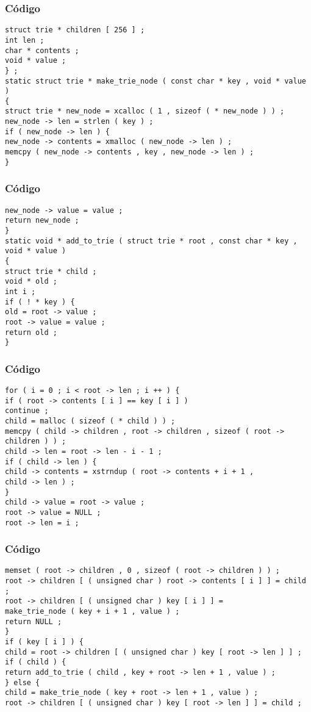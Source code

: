 \documentclass{beamer}
\begin{document}
\begin{frame}[fragile]
\frametitle{C\'odigo}
\begin{verbatim}
struct trie * children [ 256 ] ; 
int len ; 
char * contents ; 
void * value ; 
} ; 
static struct trie * make_trie_node ( const char * key , void * value ) 
{ 
struct trie * new_node = xcalloc ( 1 , sizeof ( * new_node ) ) ; 
new_node -> len = strlen ( key ) ; 
if ( new_node -> len ) { 
new_node -> contents = xmalloc ( new_node -> len ) ; 
memcpy ( new_node -> contents , key , new_node -> len ) ; 
} 
\end{verbatim}
\end{frame}
\begin{frame}[fragile]
\frametitle{C\'odigo}
\begin{verbatim}
new_node -> value = value ; 
return new_node ; 
} 
static void * add_to_trie ( struct trie * root , const char * key , void * value ) 
{ 
struct trie * child ; 
void * old ; 
int i ; 
if ( ! * key ) { 
old = root -> value ; 
root -> value = value ; 
return old ; 
} 
\end{verbatim}
\end{frame}
\begin{frame}[fragile]
\frametitle{C\'odigo}
\begin{verbatim}
for ( i = 0 ; i < root -> len ; i ++ ) { 
if ( root -> contents [ i ] == key [ i ] ) 
continue ; 
child = malloc ( sizeof ( * child ) ) ; 
memcpy ( child -> children , root -> children , sizeof ( root -> children ) ) ; 
child -> len = root -> len - i - 1 ; 
if ( child -> len ) { 
child -> contents = xstrndup ( root -> contents + i + 1 , 
child -> len ) ; 
} 
child -> value = root -> value ; 
root -> value = NULL ; 
root -> len = i ; 
\end{verbatim}
\end{frame}
\begin{frame}[fragile]
\frametitle{C\'odigo}
\begin{verbatim}
memset ( root -> children , 0 , sizeof ( root -> children ) ) ; 
root -> children [ ( unsigned char ) root -> contents [ i ] ] = child ; 
root -> children [ ( unsigned char ) key [ i ] ] = 
make_trie_node ( key + i + 1 , value ) ; 
return NULL ; 
} 
if ( key [ i ] ) { 
child = root -> children [ ( unsigned char ) key [ root -> len ] ] ; 
if ( child ) { 
return add_to_trie ( child , key + root -> len + 1 , value ) ; 
} else { 
child = make_trie_node ( key + root -> len + 1 , value ) ; 
root -> children [ ( unsigned char ) key [ root -> len ] ] = child ; 
\end{verbatim}
\end{frame}
\end{document}
